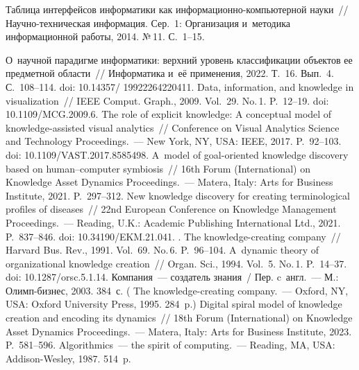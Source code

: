 \begin{multicols}{2}
{{\begin{thebibliography}{99}
 Таб\-ли\-ца интерфейсов информатики как ин\-фор\-ма\-ци\-он\-но-ком\-пью\-тер\-ной 
науки~// На\-уч\-но-тех\-ни\-че\-ская информация. Сер.~1: Организация и~методика 
информационной работы, 2014. №\,11. С.~1--15.

 О~научной па\-ра\-диг\-ме информатики: верх\-ний уровень классификации 
объ\-ек\-тов ее предметной об\-ласти~// Информатика и~её применения, 2022. Т.~16. Вып.~4. 
С.~108--114. doi: 10.14357/ 19922264220411.
 Data, information, and knowledge in visualization~// IEEE Comput. 
Graph., 2009. Vol.~29. No.\,1. P.~12--19. doi: 10.1109/MCG.2009.6.
 The role of 
explicit knowledge: A conceptual model of knowledge-assisted visual analytics~// 
Conference on Visual Analytics Science and Technology Proceedings.~--- New York, NY, USA: 
IEEE, 2017. P.~92--103. doi: 10.1109/VAST.2017.8585498.
 A~model of goal-oriented knowledge discovery based on human--computer 
symbiosis~// 16th Forum (International) on Knowledge Asset Dynamics Proceedings.~--- Matera, 
Italy: Arts for Business Institute, 2021. P.~297--312.
 New knowledge discovery for creating terminological profiles of 
diseases~// 22nd European Conference on Knowledge Management Proceedings.~--- Reading, 
U.K.: Academic Publishing International Ltd., 2021. P.~837--846. doi: 10.34190/EKM.21.041.
. The knowledge-creating company~// Harvard Bus. Rev., 1991. Vol.~69. No.\,6. 
P.~96--104.
 A~dynamic theory of organizational knowledge creation~// Organ. Sci., 1994. 
Vol.~5. No.\,1. P.~14--37. doi: 10.1287/orsc.5.1.14.
 Компания~--- создатель знания~/ Пер. c~англ.~---  
М.: Олимп-биз\-нес, 2003. 384~с. ( The knowledge-creating 
company.~--- Oxford, NY, USA: Oxford University Press, 1995. 284~p.)
 Digital spiral model of knowledge creation and encoding its dynamics~// 18th 
Forum (International) on Knowledge Asset Dynamics Proceedings.~--- Matera, Italy: Arts for 
Business Institute, 2023. P.~581--596.
 Algorithmics~--- the spirit of computing.~--- Reading, MA, USA: Addison-Wesley, 
1987. 514~p.
\end{thebibliography}

 }
 }

\end{multicols}

